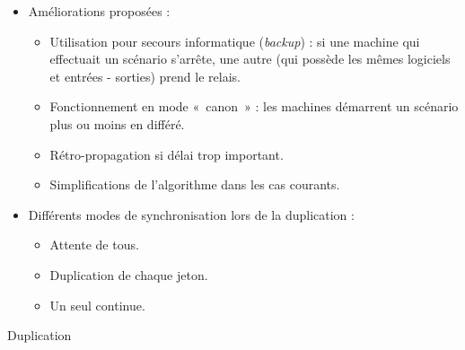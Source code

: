 \begin{frame}	
	\begin{itemize}
		\item[\textbullet] Améliorations proposées : 
			\begin{itemize}
				\item Utilisation pour secours informatique (\textit{backup}) : si une machine qui effectuait un scénario s'arrête, une autre (qui possède les mêmes logiciels et entrées - sorties) prend le relais.
				\item Fonctionnement en mode «~canon~» : les machines démarrent un scénario plus ou moins en différé.
				\item Rétro-propagation si délai trop important.
				\item Simplifications de l'algorithme dans les cas courants.
			\end{itemize}
		\vspace{1em}
		\item[\textbullet] Différents modes de synchronisation lors de la duplication : 
			\begin{itemize}
				\item Attente de tous.
				\item Duplication de chaque jeton.
				\item Un seul continue.
			\end{itemize}
	\end{itemize}
\end{frame}

\begin{frame}{Duplication}
	\begin{figure}[H]
		\centering
		
		\label{fig:petriNet}
	\end{figure}
\end{frame}